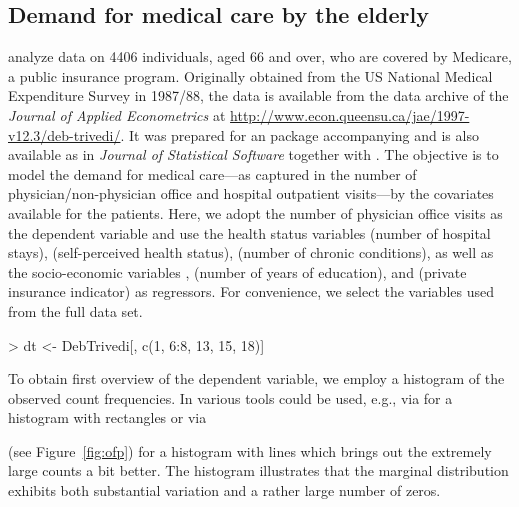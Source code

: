 \documentclass{Z}
\begin{document}
\subsection{Demand for medical care by the elderly}

\cite{countreg:Deb+Trivedi:1997} analyze data on 4406
individuals, aged 66 and over, who are covered by Medicare, a public
insurance program. Originally obtained from the US National Medical
Expenditure Survey in 1987/88, the data is available from the data archive of the
\textit{Journal of Applied Econometrics} at
\url{http://www.econ.queensu.ca/jae/1997-v12.3/deb-trivedi/}. It was
prepared for an  package accompanying
\cite{countreg:Kleiber+Zeileis:2008} and is also available as
 in \textit{Journal of Statistical Software}
together with \cite{countreg:Zeileis:2006}. The objective is to model
the demand for medical care---as captured in the number of physician/non-physician
office and hospital outpatient visits---by the covariates available
for the patients. Here, we adopt the number of physician office visits 
as the dependent variable and use the health status variables
 (number of hospital stays),
 (self-perceived health status),
 (number of chronic conditions),
as well as the socio-economic variables
,
 (number of years of education), and
 (private insurance indicator) as regressors. For convenience, we
select the variables used from the full data set.

\begin{Schunk}
\begin{Sinput}
> dt <- DebTrivedi[, c(1, 6:8, 13, 15, 18)]
\end{Sinput}
\end{Schunk}

To obtain first overview of the dependent variable, we employ a histogram of the
observed count frequencies. In  various tools could be used, e.g.,
via  for a histogram with rectangles or
via
\begin{Schunk}
\end{Schunk}
(see Figure~\ref{fig:ofp}) for a histogram with lines which brings out the extremely
large counts a bit better. The histogram illustrates that the marginal distribution
exhibits both substantial variation and a rather large number of zeros.
\end{document}
